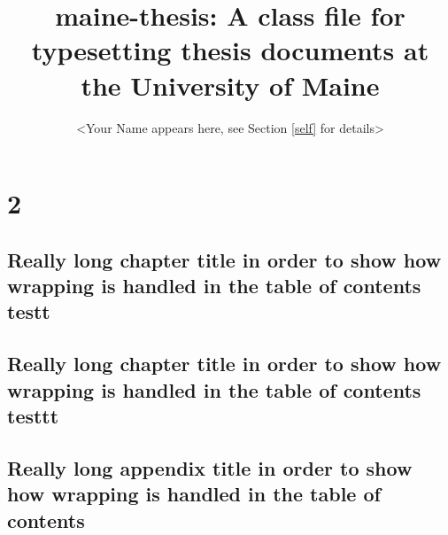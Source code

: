 \documentclass{maine-thesis}
\title{maine-thesis: A class file for typesetting thesis documents at the University of Maine}
\author{<Your Name appears here, see Section \ref{self} for details>}
\begin{document}
\preliminary
\titlepage




\part{2}
\tableofcontents
\listoftables



\chapter{Really long chapter title in order to show how wrapping is handled in the table of contents testt}
\chapter{Really long chapter title in order to show how wrapping is handled in the table of contents testtt}




\appendix


\chapter{Really long appendix title in order to show how wrapping is handled in the table of contents}


\end{document}
